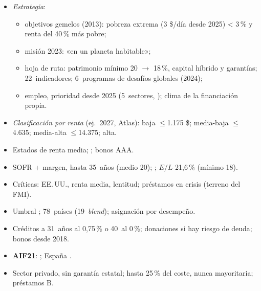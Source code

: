 \documentclass{article}
\begin{document}
\begin{columnas}
\begin{itemize}
\item \emph{Estrategia}:
  \begin{itemize}
  \item objetivos gemelos (2013): pobreza extrema (3 \$/día desde 2025) < 3\,\% y renta del 40\,\% más pobre;
  \item misión 2023: «en un planeta habitable»;
  \item hoja de ruta: patrimonio mínimo 20 $\to$ 18\,\%, capital híbrido y garantías; 22~indicadores; 6~programas de desafíos globales (2024);
  \item empleo, prioridad desde 2025 (5~sectores, ); clima  de la financiación propia.
  \end{itemize}
\end{itemize}
\begin{itemize}
\item \emph{Clasificación por renta} (ej.\ 2027, Atlas): baja $\leq$1.175 \$; media-baja $\leq$4.635; media-alta $\leq$14.375; alta.
\end{itemize}
\begin{itemize}
\item Estados de renta media; ; bonos AAA.
\item SOFR + margen, hasta 35~años (medio 20); ; $E/L$ 21,6\,\% (mínimo 18).
\item Críticas: EE.\,UU., renta media, lentitud; préstamos en crisis (terreno del FMI).
\end{itemize}
\begin{itemize}
\item Umbral ; 78~países (19~\emph{blend}); asignación por desempeño.
\item Créditos a 31~años al 0,75\,\% o 40~al 0\,\%; donaciones si hay riesgo de deuda; bonos desde 2018.
\item \textbf{AIF21}: ; España .
\end{itemize}
\begin{itemize}
\item Sector privado, sin garantía estatal; hasta 25\,\% del coste, nunca mayoritaria; préstamos B.

\end{itemize}
\end{columnas}
\end{document}
